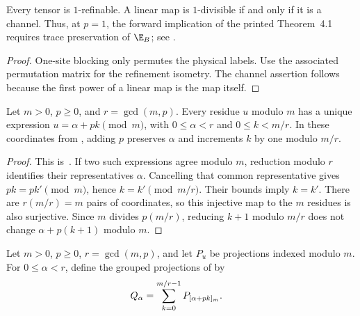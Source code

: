 \begin{lemma}
    \label{lem:periodic_refinement_one_site}
    \leanok
    Every tensor is $1$-refinable. A linear map is $1$-divisible if and only
    if it is a channel. Thus, at $p=1$, the forward implication of the
    printed Theorem~4.1 requires trace preservation of $\E_B$; see
    \cite{gap:dccsp17_thm41_forward_trace_preservation}.
\end{lemma}

\begin{proof}\leanok
    One-site blocking only permutes the physical labels. Use the associated
    permutation matrix for the refinement isometry. The channel assertion
    follows because the first power of a linear map is the map itself.
\end{proof}

\begin{lemma}
    \label{thm:periodic_step_coordinates}
    \leanok
    Let $m>0$, $p\geq0$, and $r=\gcd(m,p)$. Every residue $u$ modulo $m$
    has a unique expression $u=\alpha+pk\pmod m$, with
    $0\leq\alpha<r$ and $0\leq k<m/r$.
    In these coordinates from
    \cite[proof of Theorem~4.1]{DeLasCuevas2017Irreducible}, adding $p$
    preserves $\alpha$ and increments $k$ by one modulo $m/r$.
\end{lemma}

\begin{proof}\leanok
    This is~\cite[``Coordinates for a cyclic step'']{QICLean2026Blueprint}.
    If two such expressions agree modulo $m$, reduction modulo $r$
    identifies their representatives $\alpha$. Cancelling that common
    representative gives $pk=pk'\pmod m$, hence $k=k'\pmod{m/r}$.
    Their bounds imply $k=k'$. There are $r(m/r)=m$ pairs of coordinates,
    so this injective map to the $m$ residues is also surjective.
    Since $m$ divides $p(m/r)$, reducing $k+1$ modulo $m/r$ does not
    change $\alpha+p(k+1)$ modulo $m$.
\end{proof}

\begin{definition}
    \label{def:periodic_step_orbit_projection}
    \leanok
    Let $m>0$, $p\ge0$, $r=\gcd(m,p)$, and let $P_u$ be projections indexed
    modulo $m$. For $0\le\alpha<r$, define the grouped projections of
    \cite[Lemma~6]{DeLasCuevas2017Irreducible} by
    \begin{align}
        Q_\alpha & =\sum_{k=0}^{m/r-1}P_{[\alpha+pk]_m}. \notag
    \end{align}
\end{definition}

